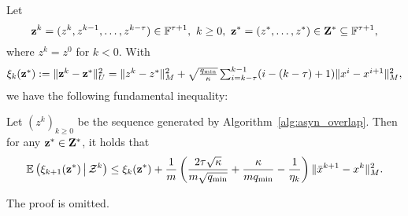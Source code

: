 {Let 
\begin{equation*}%
\vz^k=(z^k,z^{k-1},\ldots,z^{k-\tau})\in \FF^{\tau+1},~k\ge 0,~\vz^* =(z^*,\ldots,z^*)\in\vZ^*\subseteq\FF^{\tau+1},
\end{equation*}
where $z^{k}=z^{0}$ for $k<0$. With
\begin{equation}\label{eqn:xi}
\textstyle \xi_k(\vz^*) := \|\vz^k-\vz^*\|_U^2=\|z^{k} - z^*\|_M^2 +
\sqrt{q_{\min}\over \kappa}\sum_{i=k-\tau}^{k-1} (i-(k-\tau)+1) \|
x^{i} - x^{i+1}\|_M^2,
\end{equation}
we have the following fundamental inequality:
\begin{thm}\label{thm:fund_inquality}
Let $(z^k)_{k\geq 0}$ be the sequence generated by Algorithm~\ref{alg:asyn_overlap}. Then for any ${\mathbf{z}}^*\in{\mathbf{Z}}^*$, it holds that %
\begin{equation}\label{eqn:fund_inquality}
\begin{aligned}
\mathbb{E}\left(\xi_{k+1}(\vz^*) \,\big|\, \cZ^k\right)  
\leq  \xi_k(\vz^*)  + \frac{1}{m}
\left(\frac{2\tau\sqrt{\kappa}}{m\sqrt{q_{\min}}} +
{\kappa\over mq_{\min}} - \frac{1}{ \eta_k}\right)
\|\bar{x}^{k+1} - x^k \|_M^2.
\end{aligned}
\end{equation}
\end{thm}

The proof is omitted. 
}
